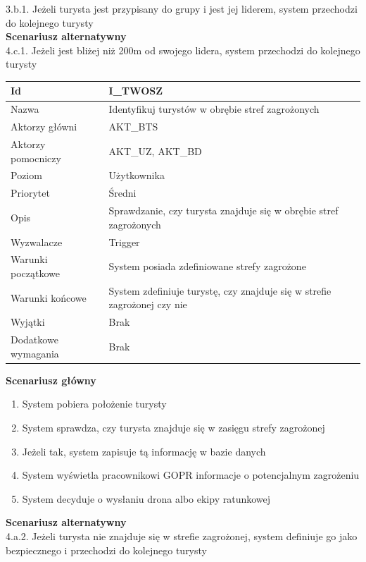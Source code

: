 \documentclass[a4paper,12pt]{article}
\begin{document}
3.b.1.	Jeżeli turysta jest przypisany do grupy i  jest jej liderem, system przechodzi do kolejnego turysty\\
\textbf{Scenariusz alternatywny}\\
4.c.1.	Jeżeli jest bliżej niż 200m od swojego lidera, system przechodzi do kolejnego turysty
\newpage
\begin{longtable}{| p{5cm} | p{10cm} |}
\hline
Id & I\_TWOSZ \\\hline
Nazwa & Identyfikuj turystów w obrębie stref zagrożonych \\\hline
Aktorzy główni & AKT\_BTS \\\hline
Aktorzy pomocniczy & AKT\_UZ, AKT\_BD \\\hline
Poziom & Użytkownika \\\hline
Priorytet & Średni \\\hline
Opis & Sprawdzanie, czy turysta znajduje się w obrębie stref zagrożonych \\\hline
Wyzwalacze & Trigger \\\hline
Warunki początkowe & System posiada zdefiniowane strefy zagrożone \\\hline
Warunki końcowe & System zdefiniuje turystę, czy znajduje się w strefie zagrożonej czy nie \\\hline
Wyjątki & Brak \\\hline
Dodatkowe wymagania & Brak \\\hline
\end{longtable}
\textbf{Scenariusz główny}
\begin{enumerate}
\item System pobiera położenie turysty
\item System sprawdza, czy turysta znajduje się w zasięgu strefy zagrożonej
\item Jeżeli tak, system zapisuje tą informację w bazie danych
\item System wyświetla pracownikowi GOPR informacje o potencjalnym zagrożeniu
\item System decyduje o wysłaniu drona albo ekipy ratunkowej
\end{enumerate}
\textbf{Scenariusz alternatywny}\\
4.a.2.	Jeżeli turysta nie znajduje się w strefie zagrożonej, system definiuje go jako bezpiecznego i przechodzi do kolejnego turysty
\newpage
\end{document}
